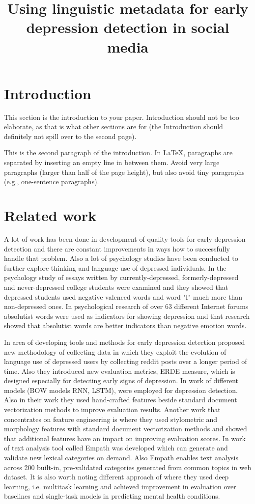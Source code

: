 \documentclass[10pt, a4paper]{article}
\title{Using linguistic metadata for early depression detection in social media}
\begin{document}
\maketitleabstract

\section{Introduction}

This section is the introduction to your paper. Introduction should not be too elaborate, as that is what other sections are for (the Introduction should definitely not spill over to the second page). 

This is the second paragraph of the introduction. In \LaTeX , paragraphs are separated by inserting an empty line in between them.  Avoid very large paragraphs (larger than half of the page height), but also avoid tiny paragraphs (e.g., one-sentence paragraphs).

\section{Related work}

A lot of work has been done in development of quality tools for early depression detection and there are constant improvements in ways how to successfully handle that problem. Also a lot of psychology studies have been conducted to further explore thinking and language use of depressed individuals. 
In the psychology study of \citep{rudeGortner2004} essays written by currently-depressed, formerly-depressed and never-depressed college students were examined and they showed that depressed students used negative valenced words and word "I" much more than non-depressed ones. In psychological research of \citep{mosaiwi} over 63 different Internet forums absolutist words were used as indicators for showing depression and that research showed that absolutist words are better indicators than negative emotion words.
 
In area of developing tools and methods for early depression detection \citep{losada-crestani2016} proposed new methodology of collecting data in which they exploit the evolution of language use of depressed users by collecting reddit posts over a longer period of time. Also they introduced new evaluation metrics, ERDE measure, which is designed especially for detecting early signs of depression. In work of \citep{Trotzek2017LinguisticMA} different models (BOW models RNN, LSTM),  were employed for depression detection. Also in their work they used hand-crafted features beside standard document vectorization methods to improve evaluation results. Another work that concentrates on feature engineering is \citep{icpram18} where they used stylometric and morphology features with standard document vectorization methods and showed that additional features have an impact on improving evaluation scores.
In work of \citep{empath2016} text analysis tool called Empath was developed which can generate and validate new lexical categories on demand. Also Empath enables text analysis across 200 built-in, pre-validated categories generated from common topics in web dataset. 
It is also worth noting different approach of \citep{E17-1015} where they used deep learning, i.e. multitask learning and achieved improvement in evaluation over baselines and single-task models in predicting mental health conditions.
\end{document}
